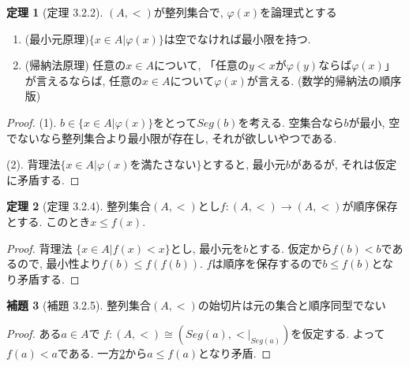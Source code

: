 \documentclass[dvipdfmx,a4paper,11pt]{article}
\theoremstyle{definition}
\newtheorem{thm}{定理}
\newtheorem{lem}[thm]{補題}
\begin{document}
 \begin{tcolorbox}
 [colback = white, colframe = green!35!black, fonttitle = \bfseries,breakable = true]
 \begin{thm}[定理 3.2.2]
 $(A,<)$が整列集合で, $\varphi(x)$を論理式とする
 \begin{enumerate}
 \item (最小元原理)$\{ x \in A | \varphi (x) \}$は空でなければ最小限を持つ.
 \item (帰納法原理) 任意の$x \in A$について, 「任意の$y<x$が$\varphi(y)$ならば$\varphi(x)$」が言えるならば, 任意の$x \in A$について$\varphi(x)$が言える. (数学的帰納法の順序版)
 \end{enumerate}
 \end{thm}
 \end{tcolorbox}
 \begin{proof}
 (1). $b \in \{ x \in A | \varphi (x)\}$をとって$Seg(b)$を考える. 空集合なら$b$が最小, 空でないなら整列集合より最小限が存在し, それが欲しいやつである.
 
 (2). 背理法$\{ x \in A | \varphi (x)\text{を満たさない}\}$とすると, 最小元$b$があるが, それは仮定に矛盾する. 
 \end{proof}

 \begin{tcolorbox}
 [colback = white, colframe = green!35!black, fonttitle = \bfseries,breakable = true]
\begin{thm}[定理 3.2.4]
\label{thm-tanaka-3.2.4}
整列集合$(A,<)$とし$f : (A,<) \to (A,<)$が順序保存とする. 
このとき$x \le f(x)$.
\end{thm}
\end{tcolorbox}
\begin{proof}
背理法 $\{ x \in A | f(x) <x \}$とし, 最小元を$b$とする. 
仮定から$f(b) < b$であるので, 最小性より$f(b) \le f(f(b))$. $f$は順序を保存するので$b \le f(b)$となり矛盾する. 
\end{proof}

 \begin{tcolorbox}
 [colback = white, colframe = green!35!black, fonttitle = \bfseries,breakable = true]
\begin{lem}[補題 3.2.5]
整列集合$(A,<)$の始切片は元の集合と順序同型でない
\end{lem}
\end{tcolorbox}
\begin{proof}
ある$a \in A$で
$f: (A,<) \cong (Seg(a), <|_{Seg(a)})$を仮定する. 
よって$f(a) < a$である.
一方\ref{thm-tanaka-3.2.4}から$a \le f(a)$となり矛盾.
\end{proof}
\end{document}
